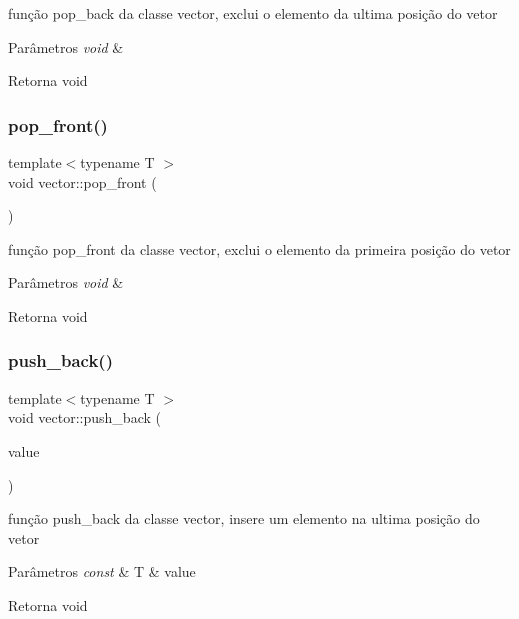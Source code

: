 função pop\+\_\+back da classe vector, exclui o elemento da ultima posição do vetor 
\begin{DoxyParams}{Parâmetros}
{\em void} & \\
\hline
\end{DoxyParams}
\begin{DoxyReturn}{Retorna}
void 
\end{DoxyReturn}
\mbox{\label{classsc_1_1vector_abd1b780aa2d88a981e36ca6cc40c2e51}} 
\subsubsection{\texorpdfstring{pop\+\_\+front()}{pop\_front()}}
{\footnotesize\ttfamily template$<$typename T $>$ \\
void vector\+::pop\+\_\+front (\begin{DoxyParamCaption}{ }\end{DoxyParamCaption})}

função pop\+\_\+front da classe vector, exclui o elemento da primeira posição do vetor 
\begin{DoxyParams}{Parâmetros}
{\em void} & \\
\hline
\end{DoxyParams}
\begin{DoxyReturn}{Retorna}
void 
\end{DoxyReturn}
\mbox{\label{classsc_1_1vector_a4cf27b8604e2465550bcc2f36405d3dc}} 
\subsubsection{\texorpdfstring{push\+\_\+back()}{push\_back()}}
{\footnotesize\ttfamily template$<$typename T $>$ \\
void vector\+::push\+\_\+back (\begin{DoxyParamCaption}\item[{const T \&}]{value }\end{DoxyParamCaption})}

função push\+\_\+back da classe vector, insere um elemento na ultima posição do vetor 
\begin{DoxyParams}{Parâmetros}
{\em const} & T \& value \\
\hline
\end{DoxyParams}
\begin{DoxyReturn}{Retorna}
void 
\end{DoxyReturn}
\mbox{\label{classsc_1_1vector_a6af9e24185373de9b47507cb868667fe}} 

